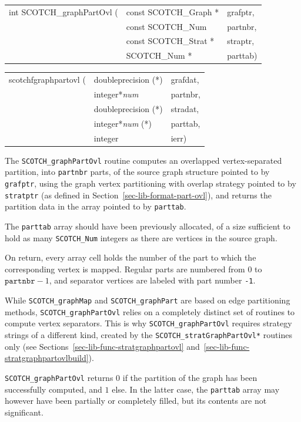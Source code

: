 \begin{itemize}
\progsyn

{\tt\begin{tabular}{l@{}ll}
int SCOTCH\_graphPartOvl ( & const SCOTCH\_Graph * & grafptr, \\
                           & const SCOTCH\_Num     & partnbr, \\
                           & const SCOTCH\_Strat * & straptr, \\
                           & SCOTCH\_Num *         & parttab)
\end{tabular}}

{\tt\begin{tabular}{l@{}ll}
scotchfgraphpartovl ( & doubleprecision (*)   & grafdat, \\
                      & integer*{\it num}     & partnbr, \\
                      & doubleprecision (*)   & stradat, \\
                      & integer*{\it num} (*) & parttab, \\
                      & integer               & ierr)
\end{tabular}}

\progdes

The {\tt SCOTCH\_graphPartOvl} routine computes an overlapped
vertex-separated partition, into {\tt partnbr} parts, of the source
graph structure pointed to by {\tt grafptr}, using the graph vertex
partitioning with overlap strategy pointed to by {\tt stratptr} (as
defined in Section~\ref{sec-lib-format-part-ovl}), and returns the
partition data in the array pointed to by {\tt parttab}.

The {\tt parttab} array should have been previously allocated, of a
size sufficient to hold as many {\tt SCOTCH\_\lbt Num} integers as
there are vertices in the source graph.

On return, every array cell holds the number of the part to which the
corresponding vertex is mapped. Regular parts are numbered from $0$ to
$\mathtt{partnbr} - 1$, and separator vertices are labeled with part
number {\tt -1}.

While {\tt SCOTCH\_graphMap} and {\tt SCOTCH\_\lbt graph\lbt Part} are
based on edge partitioning methods,
{\tt SCOTCH\_\lbt graph\lbt Part\lbt Ovl} relies on a completely
distinct set of routines to compute vertex separators. This is why
{\tt SCOTCH\_\lbt graph\lbt Part\lbt Ovl} requires strategy strings of
a different kind, created by the
{\tt SCOTCH\_\lbt strat\lbt Graph\lbt   Part\lbt Ovl*} routines only
(see Sections~\ref{sec-lib-func-stratgraphpartovl}
and~\ref{sec-lib-func-stratgraphpartovlbuild}).

\progret

{\tt SCOTCH\_graphPartOvl} returns $0$ if the partition of the graph
has been successfully computed, and $1$ else. In the latter case, the
{\tt parttab} array may however have been partially or completely
filled, but its contents are not significant.
\end{itemize}

